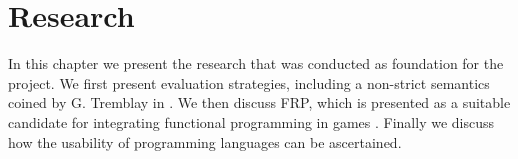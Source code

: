 \chapter{Research}
In this chapter we present the research that was conducted as foundation for the project. We first present evaluation strategies, including a non-strict semantics coined  by G. Tremblay in \cite{DBLP:journals/cl/Tremblay-lenient}. We then discuss \gls{FRP}, which is presented as a suitable candidate for integrating functional programming in games \cite{maraffi:frp,courtney2003yampa,cheong2005functional}. Finally we discuss how the usability of programming languages can be ascertained.




